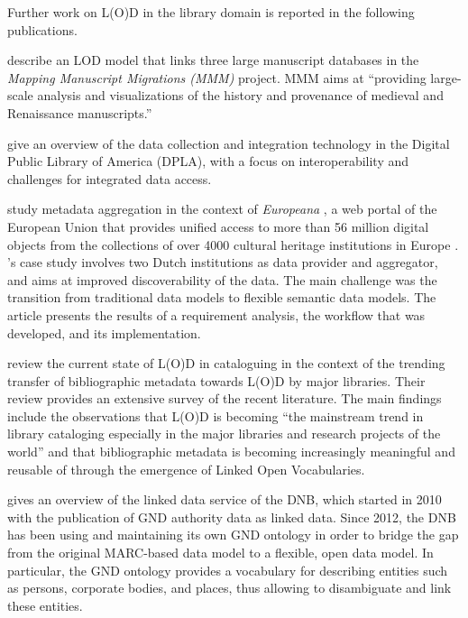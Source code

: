 Further work on L(O)D in the library domain is reported in the following publications.

\textcite{Burrows2021} describe an LOD model that links
three large manuscript databases
in the \emph{Mapping Manuscript Migrations (MMM)} project.
MMM aims at \enquote{providing large-scale analysis and visualizations of the history and provenance of medieval and Renaissance manuscripts.}

\textcite{LigiaTriques2022} give an overview of the data collection and integration technology
in the Digital Public Library of America (DPLA), with a focus on
interoperability and challenges for integrated data access.

\textcite{Freire2019} study metadata aggregation in the context of \emph{Europeana} \autocite{Isaac2012,Petras2017},
a web portal of the European Union that provides unified access to 
more than 56 million digital objects
from the collections of over 4000 cultural heritage institutions in Europe \autocite{Europeana}.
\citeauthor{Freire2019}'s case study involves two Dutch institutions as data provider and aggregator,
and aims at improved discoverability of the data.
The main challenge was the transition from traditional data models to flexible semantic data models.
The article presents the results of a requirement analysis,
the workflow that was developed, and its implementation.

\textcite{Ullah2018} review the current state of L(O)D in cataloguing
in the context of the trending transfer of bibliographic metadata
towards L(O)D by major libraries.
Their review provides an extensive survey of the recent literature.
The main findings include
the observations that L(O)D is becoming
\enquote{the mainstream trend in library cataloging especially in the major libraries and research projects of the world}
and that bibliographic metadata is becoming increasingly meaningful and reusable of through the emergence of Linked Open Vocabularies.

\textcite{Hauser2014} gives an overview of the linked data service
of the \gls{DNB},
which started in 2010 with the publication of \gls{GND} authority data as linked data.
Since 2012, the \gls{DNB} has been using and maintaining its own \gls{GND} ontology \autocite{GNDOntology}
in order to bridge the gap from the original MARC-based data model to a flexible, open data model.
In particular, the \gls{GND} ontology provides a vocabulary for describing entities such as persons, corporate bodies, and places,
thus allowing to disambiguate and link these entities.

